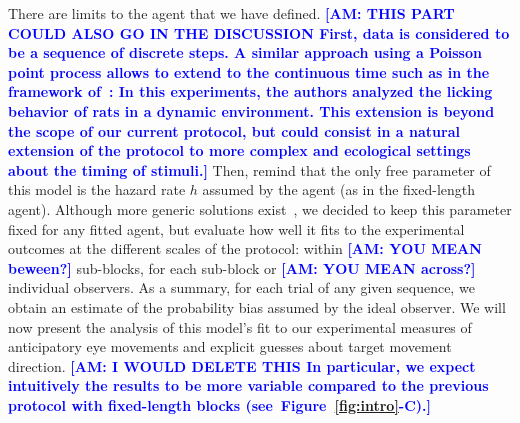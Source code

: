 \documentclass[12pt,english]{article}%
\newcommand{\citep}[1]{\parencite{#1}}
\newcommand{\citet}[1]{\textcite{#1}}
\newcommand{\seeFig}[1]{Figure~\ref{fig:#1}}
\newcommand{\AM}[1]{\textbf{\textcolor{blue}{[AM: #1]}}}
\begin{document}
There are limits to the agent that we have defined.
\AM{THIS PART COULD ALSO GO IN THE DISCUSSION First, data is considered to be a sequence of discrete steps.
A similar approach using a Poisson point process
allows to extend to the continuous time
such as in the framework of~\citet{RadilloBrady2017}:
In this experiments, the authors analyzed the licking behavior of rats in a dynamic environment.
This extension is beyond the scope of our current protocol,
but could consist in a natural extension of the protocol
to more complex and ecological settings about the timing of stimuli.}
Then, remind that the only free parameter of this model is the hazard rate $h$
assumed by the agent (as in the fixed-length agent).
Although more generic solutions exist~\citep{Wilson13,Wilson18},
we decided to keep this parameter fixed for any fitted agent, but evaluate
how well it fits to the experimental outcomes at the different scales of the protocol:
within \AM{YOU MEAN beween?} sub-blocks, for each sub-block or \AM{YOU MEAN across?} individual observers.
As a summary, for each trial of any given sequence,
we obtain an estimate of the probability bias assumed by the ideal observer. We will now present the analysis of this model's fit to our experimental measures of anticipatory eye movements and explicit guesses about target movement direction.
\AM{I WOULD DELETE THIS In particular, we expect intuitively the results to be more variable
compared to the previous protocol with fixed-length blocks (see~\seeFig{intro}-C).}
\end{document}
